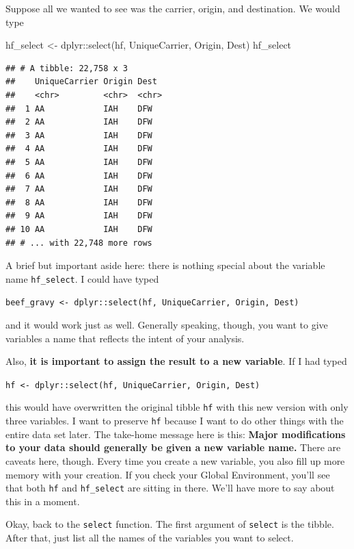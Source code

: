 \documentclass[
]{book}
\newenvironment{Shaded}{\begin{snugshade}}{\end{snugshade}}
\newcommand{\FunctionTok}[1]{\textcolor[rgb]{0.00,0.00,0.00}{#1}}
\newcommand{\NormalTok}[1]{#1}
\newcommand{\OtherTok}[1]{\textcolor[rgb]{0.56,0.35,0.01}{#1}}
\newcommand{\SpecialCharTok}[1]{\textcolor[rgb]{0.00,0.00,0.00}{#1}}
\begin{document}
Suppose all we wanted to see was the carrier, origin, and destination. We would type

\begin{Shaded}
\begin{Highlighting}[]
\NormalTok{hf\_select }\OtherTok{\textless{}{-}}\NormalTok{ dplyr}\SpecialCharTok{::}\FunctionTok{select}\NormalTok{(hf, UniqueCarrier, Origin, Dest)}
\NormalTok{hf\_select}
\end{Highlighting}
\end{Shaded}

\begin{verbatim}
## # A tibble: 22,758 x 3
##    UniqueCarrier Origin Dest 
##    <chr>         <chr>  <chr>
##  1 AA            IAH    DFW  
##  2 AA            IAH    DFW  
##  3 AA            IAH    DFW  
##  4 AA            IAH    DFW  
##  5 AA            IAH    DFW  
##  6 AA            IAH    DFW  
##  7 AA            IAH    DFW  
##  8 AA            IAH    DFW  
##  9 AA            IAH    DFW  
## 10 AA            IAH    DFW  
## # ... with 22,748 more rows
\end{verbatim}

A brief but important aside here: there is nothing special about the variable name \texttt{hf\_select}. I could have typed

\texttt{beef\_gravy\ \textless{}-\ dplyr::select(hf,\ UniqueCarrier,\ Origin,\ Dest)}

and it would work just as well. Generally speaking, though, you want to give variables a name that reflects the intent of your analysis.

Also, \textbf{it is important to assign the result to a new variable}. If I had typed

\texttt{hf\ \textless{}-\ dplyr::select(hf,\ UniqueCarrier,\ Origin,\ Dest)}

this would have overwritten the original tibble \texttt{hf} with this new version with only three variables. I want to preserve \texttt{hf} because I want to do other things with the entire data set later. The take-home message here is this: \textbf{Major modifications to your data should generally be given a new variable name.} There are caveats here, though. Every time you create a new variable, you also fill up more memory with your creation. If you check your Global Environment, you'll see that both \texttt{hf} and \texttt{hf\_select} are sitting in there. We'll have more to say about this in a moment.

Okay, back to the \texttt{select} function. The first argument of \texttt{select} is the tibble. After that, just list all the names of the variables you want to select.
\end{document}

